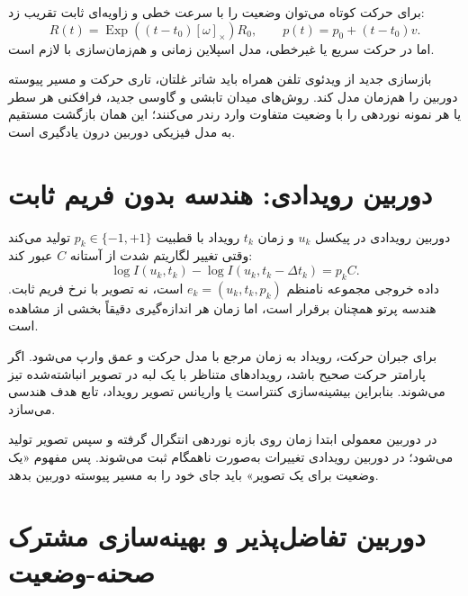 \documentclass[12pt,openany,oneside]{book}
\newcommand{\skewm}[1]{\left[#1\right]_{\times}}
\newcommand{\Exp}{\operatorname{Exp}}
\begin{document}
برای حرکت کوتاه می‌توان وضعیت را با سرعت خطی و زاویه‌ای ثابت تقریب زد:
\begin{equation}
R(t)=\Exp((t-t_0)\skewm{\omega})R_0,
\qquad
p(t)=p_0+(t-t_0)v.
\end{equation}
اما در حرکت سریع یا غیرخطی، مدل اسپلاین زمانی و هم‌زمان‌سازی با  لازم است.

\begin{futurebox}
بازسازی جدید از ویدئوی تلفن همراه باید شاتر غلتان، تاری حرکت و مسیر پیوسته دوربین را هم‌زمان مدل کند. روش‌های میدان تابشی
و گاوسی جدید، فرافکنی هر سطر یا هر نمونه نوردهی را با وضعیت متفاوت وارد رندر می‌کنند؛ این همان بازگشت مستقیم به مدل فیزیکی
دوربین درون یادگیری است.
\end{futurebox}

\section{دوربین رویدادی: هندسه بدون فریم ثابت}

دوربین رویدادی در پیکسل \(u_k\) و زمان \(t_k\) رویداد با قطبیت \(p_k\in\{-1,+1\}\) تولید می‌کند وقتی تغییر لگاریتم شدت
از آستانه \(C\) عبور کند:
\begin{equation}
\log I(u_k,t_k)-\log I(u_k,t_k-\Delta t_k)=p_kC.
\label{eq:event-model}
\end{equation}
داده خروجی مجموعه نامنظم \(e_k=(u_k,t_k,p_k)\) است، نه تصویر با نرخ فریم ثابت. هندسه پرتو همچنان برقرار است، اما
زمان هر اندازه‌گیری دقیقاً بخشی از مشاهده است.

برای جبران حرکت، رویداد به زمان مرجع با مدل حرکت و عمق وارپ می‌شود. اگر پارامتر حرکت صحیح باشد، رویدادهای متناظر با یک
لبه در تصویر انباشته‌شده تیز می‌شوند. بنابراین بیشینه‌سازی کنتراست یا واریانس تصویر رویداد، تابع هدف هندسی می‌سازد.

\begin{keybox}
در دوربین معمولی ابتدا زمان روی بازه نوردهی انتگرال گرفته و سپس تصویر تولید می‌شود؛ در دوربین رویدادی تغییرات به‌صورت
ناهمگام ثبت می‌شوند. پس مفهوم «یک وضعیت برای یک تصویر» باید جای خود را به مسیر پیوسته دوربین بدهد.
\end{keybox}

\section{دوربین تفاضل‌پذیر و بهینه‌سازی مشترک صحنه-وضعیت}
\end{document}
